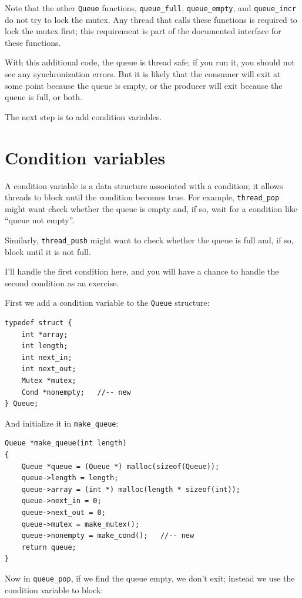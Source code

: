 \documentclass[12pt]{book}
\begin{document}
{Note that the other {\tt Queue} functions, \verb"queue_full",
\verb"queue_empty", and \verb"queue_incr" do not try to lock
the mutex.  Any thread that calls these functions is required to
lock the mutex first; this requirement is part of the documented
interface for these functions.

With this additional code, the queue is thread safe; if you run it, you
should not see any synchronization errors.  But it is likely
that the consumer will exit at some point because the queue is
empty, or the producer will exit because the queue is full,
or both.

The next step is to add condition variables.


\section{Condition variables}

A condition variable is a data structure associated with a condition;
it allows threads to block until the condition becomes true.  For
example, \verb"thread_pop" might want check whether the queue is
empty and, if so, wait for a condition like ``queue not empty''.

Similarly, \verb"thread_push" might want to check whether the queue is
full and, if so, block until it is not full.

I'll handle the first condition here, and you will have a chance to
handle the second condition as an exercise.

First we add a condition variable to the {\tt Queue} structure:

\begin{verbatim}
typedef struct {
    int *array;
    int length;
    int next_in;
    int next_out;
    Mutex *mutex;
    Cond *nonempty;   //-- new
} Queue;
\end{verbatim}

And initialize it in \verb"make_queue":

\begin{verbatim}
Queue *make_queue(int length)
{
    Queue *queue = (Queue *) malloc(sizeof(Queue));
    queue->length = length;
    queue->array = (int *) malloc(length * sizeof(int));
    queue->next_in = 0;
    queue->next_out = 0;
    queue->mutex = make_mutex();
    queue->nonempty = make_cond();   //-- new
    return queue;
}
\end{verbatim}

Now in \verb"queue_pop", if we find the queue empty, we don't
exit; instead we use the condition variable to block:

}
\end{document}
